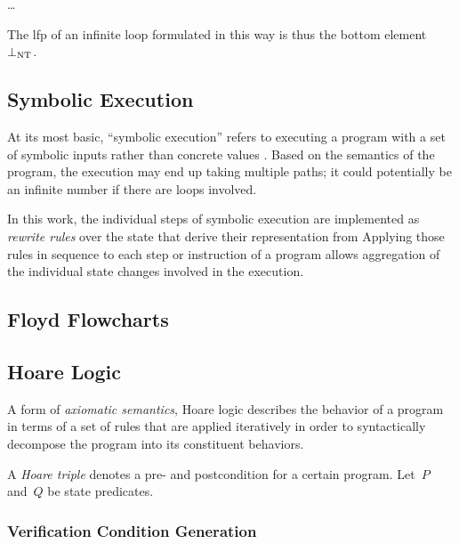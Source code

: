 \todo\dots

The \ac{lfp} of an infinite loop formulated in this way
is thus the bottom element $\bot_\mathrm{NT}$.%

\subsection{Symbolic Execution}
At its most basic, ``symbolic execution'' refers to
executing a program with a set of symbolic inputs
rather than concrete values \autocite{king1976symbolic}.
Based on the semantics of the program, the execution may end up taking multiple paths;
it could potentially be an infinite number if there are loops involved.


In this work, the individual steps of symbolic execution
are implemented as \emph{rewrite rules} over the state%
that derive their representation from 
Applying those rules in sequence to each step or instruction of a program
allows aggregation of the individual state changes involved in the execution.

\subsection{Floyd Flowcharts}\label{se:floyd}

\subsection{Hoare Logic}\label{se:hoare}
A form of \emph{axiomatic semantics},
Hoare logic \autocite{hoare1969axiomatic,myreen2007hoare}%
describes the behavior of a program
in terms of a set of rules that are applied iteratively
in order to syntactically decompose the program into its constituent behaviors.

A \emph{Hoare triple} denotes a pre- and postcondition for a certain program.%
%
%
Let~$P$ and~$Q$ be state predicates.


\subsubsection{Verification Condition Generation}

